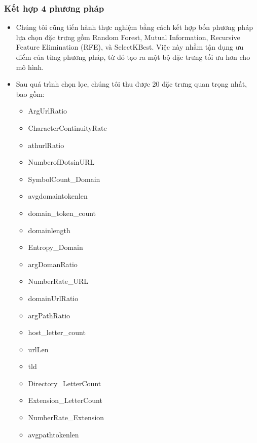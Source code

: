 \documentclass[13pt]{article}
\begin{document}
\subsubsection{Kết hợp 4 phương pháp}
\begin{itemize}
    \item Chúng tôi cũng tiến hành thực nghiệm bằng cách kết hợp bốn phương pháp lựa chọn đặc trưng gồm Random Forest, Mutual Information, Recursive Feature Elimination (RFE), và SelectKBest. Việc này nhằm tận dụng ưu điểm của từng phương pháp, từ đó tạo ra một bộ đặc trưng tối ưu hơn cho mô hình.
    \item Sau quá trình chọn lọc, chúng tôi thu được 20 đặc trưng quan trọng nhất, bao gồm:
    \begin{itemize}
        \item ArgUrlRatio
        \item CharacterContinuityRate
        \item athurlRatio
        \item NumberofDotsinURL
        \item SymbolCount\_Domain
        \item avgdomaintokenlen
        \item domain\_token\_count
        \item domainlength
        \item Entropy\_Domain
        \item argDomanRatio
        \item NumberRate\_URL
        \item domainUrlRatio
        \item argPathRatio
        \item host\_letter\_count
        \item urlLen
        \item tld
        \item Directory\_LetterCount
        \item Extension\_LetterCount
        \item NumberRate\_Extension
        \item avgpathtokenlen
    \end{itemize}
\end{itemize}
\end{document}
